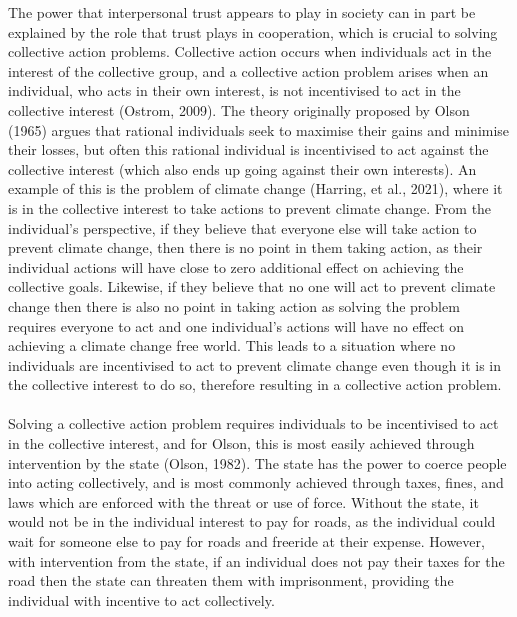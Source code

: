 \documentclass[
  11pt,
]{article}
\begin{document}
The power that interpersonal trust appears to play in society can in part be explained by the role that trust plays in cooperation, which is crucial to solving collective action problems. Collective action occurs when individuals act in the interest of the collective group, and a collective action problem arises when an individual, who acts in their own interest, is not incentivised to act in the collective interest (Ostrom, 2009). The theory originally proposed by Olson (1965) argues that rational individuals seek to maximise their gains and minimise their losses, but often this rational individual is incentivised to act against the collective interest (which also ends up going against their own interests). An example of this is the problem of climate change (Harring, et al., 2021), where it is in the collective interest to take actions to prevent climate change. From the individual's perspective, if they believe that everyone else will take action to prevent climate change, then there is no point in them taking action, as their individual actions will have close to zero additional effect on achieving the collective goals. Likewise, if they believe that no one will act to prevent climate change then there is also no point in taking action as solving the problem requires everyone to act and one individual's actions will have no effect on achieving a climate change free world. This leads to a situation where no individuals are incentivised to act to prevent climate change even though it is in the collective interest to do so, therefore resulting in a collective action problem.\\
~\\
Solving a collective action problem requires individuals to be incentivised to act in the collective interest, and for Olson, this is most easily achieved through intervention by the state (Olson, 1982). The state has the power to coerce people into acting collectively, and is most commonly achieved through taxes, fines, and laws which are enforced with the threat or use of force. Without the state, it would not be in the individual interest to pay for roads, as the individual could wait for someone else to pay for roads and freeride at their expense. However, with intervention from the state, if an individual does not pay their taxes for the road then the state can threaten them with imprisonment, providing the individual with incentive to act collectively.\\
~\\
\end{document}

